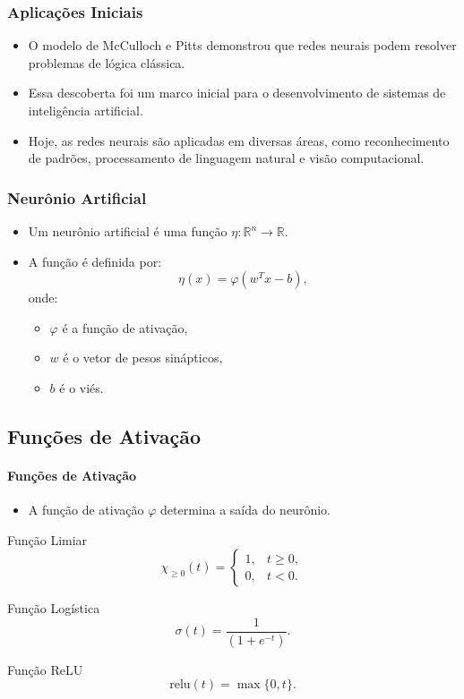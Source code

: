 \documentclass[aspectratio=169]{beamer}
\begin{document}
\begin{frame}
\frametitle{Aplicações Iniciais}
\begin{itemize}
    \item O modelo de McCulloch e Pitts demonstrou que redes neurais podem resolver problemas de lógica clássica.
    \item Essa descoberta foi um marco inicial para o desenvolvimento de sistemas de inteligência artificial.
    \item Hoje, as redes neurais são aplicadas em diversas áreas, como reconhecimento de padrões, processamento de linguagem natural e visão computacional.
\end{itemize}
\end{frame}

\begin{frame}
\frametitle{Neurônio Artificial}
\begin{itemize}
    \item Um neurônio artificial é uma função \( \eta : \mathbb{R}^n \to \mathbb{R} \).
    \item A função é definida por:
    \[
    \eta(x) = \varphi(w^T x - b),
    \]
    onde:
    \begin{itemize}
        \item \( \varphi \) é a função de ativação,
        \item \( w \) é o vetor de pesos sinápticos,
        \item \( b \) é o viés.
    \end{itemize}
\end{itemize}
\end{frame}
\subsection{Funções de Ativação}
\begin{frame}
\framesubtitle{Funções de Ativação}
\footnotesize
\begin{itemize}
    \item A função de ativação \( \varphi \) determina a saída do neurônio.

\end{itemize}
\begin{block}{Função Limiar}
\[
\chi_{\geq 0}(t) =
\begin{cases}
1, & t \geq 0, \\
0, & t < 0.
\end{cases}
\]
\end{block}
\begin{block}{Função Logística}
\[
\sigma(t) = \frac{1}{(1 + e^{-t})}.
\]
\end{block}
\begin{block}{Função ReLU}
\[
\text{relu}(t) = \max\{0, t\}.
\]
\end{block}
\end{frame}
\end{document}
